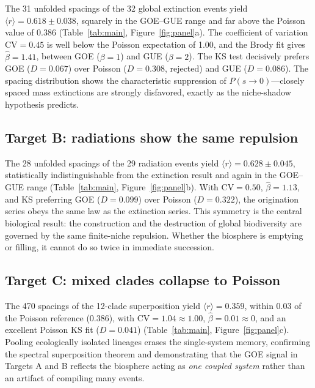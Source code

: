 \documentclass[12pt,a4paper]{article}
\begin{document}
The 31 unfolded spacings of the 32 global extinction events yield $\langle r\rangle=0.618\pm0.038$, squarely in the GOE--GUE range and far above the Poisson value of 0.386 (Table~\ref{tab:main}, Figure~\ref{fig:panel}a). The coefficient of variation $\mathrm{CV}=0.45$ is well below the Poisson expectation of 1.00, and the Brody fit gives $\hat\beta=1.41$, between GOE ($\beta=1$) and GUE ($\beta=2$). The KS test decisively prefers GOE ($D=0.067$) over Poisson ($D=0.308$, rejected) and GUE ($D=0.086$). The spacing distribution shows the characteristic suppression of $P(s\to0)$---closely spaced mass extinctions are strongly disfavored, exactly as the niche-shadow hypothesis predicts.

\subsection{Target B: radiations show the same repulsion}

The 28 unfolded spacings of the 29 radiation events yield $\langle r\rangle=0.628\pm0.045$, statistically indistinguishable from the extinction result and again in the GOE--GUE range (Table~\ref{tab:main}, Figure~\ref{fig:panel}b). With $\mathrm{CV}=0.50$, $\hat\beta=1.13$, and KS preferring GOE ($D=0.099$) over Poisson ($D=0.322$), the origination series obeys the same law as the extinction series. This symmetry is the central biological result: the construction and the destruction of global biodiversity are governed by the same finite-niche repulsion. Whether the biosphere is emptying or filling, it cannot do so twice in immediate succession.

\subsection{Target C: mixed clades collapse to Poisson}

The 470 spacings of the 12-clade superposition yield $\langle r\rangle=0.359$, within 0.03 of the Poisson reference (0.386), with $\mathrm{CV}=1.04\approx1.00$, $\hat\beta=0.01\approx0$, and an excellent Poisson KS fit ($D=0.041$) (Table~\ref{tab:main}, Figure~\ref{fig:panel}c). Pooling ecologically isolated lineages erases the single-system memory, confirming the spectral superposition theorem and demonstrating that the GOE signal in Targets A and B reflects the biosphere acting as \emph{one coupled system} rather than an artifact of compiling many events.
\end{document}
